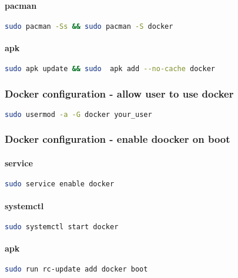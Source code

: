 \paragraph{pacman} \begin{lstlisting}[language=bash,label={lst:pacman-docker}]
sudo pacman -Ss && sudo pacman -S docker
\end{lstlisting}
\paragraph{apk} \begin{lstlisting}[language=bash,label={lst:apk-docker}]
sudo apk update && sudo  apk add --no-cache docker
\end{lstlisting}

\subsubsection{Docker configuration - allow user to use docker}
\begin{lstlisting}[language=bash,label={lst:add-group-docker}]
sudo usermod -a -G docker your_user
\end{lstlisting}

\subsubsection{Docker configuration - enable doocker on boot}
\paragraph{service} \begin{lstlisting}[language=bash,label={lst:service-docker}]
sudo service enable docker
\end{lstlisting}
\paragraph{systemctl} \begin{lstlisting}[language=bash,label={lst:systemctl-docker}]
sudo systemctl start docker
\end{lstlisting}
\paragraph{apk} \begin{lstlisting}[language=bash,label={lst:rc-docker}]
sudo run rc-update add docker boot
\end{lstlisting}

